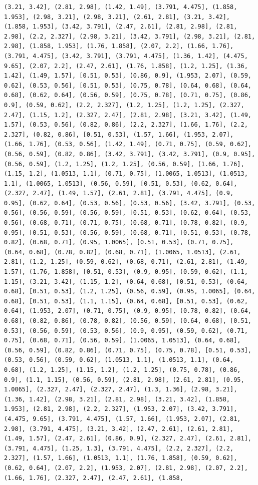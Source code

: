 \documentclass[12pt,fleqn]{article}\usepackage{../common}
\begin{document}
\begin{verbatim}
(3.21, 3.42], (2.81, 2.98], (1.42, 1.49], (3.791, 4.475], (1.858, 1.953], (2.98, 3.21], (2.98, 3.21], (2.61, 2.81], (3.21, 3.42], (1.858, 1.953], (3.42, 3.791], (2.47, 2.61], (2.81, 2.98], (2.81, 2.98], (2.2, 2.327], (2.98, 3.21], (3.42, 3.791], (2.98, 3.21], (2.81, 2.98], (1.858, 1.953], (1.76, 1.858], (2.07, 2.2], (1.66, 1.76], (3.791, 4.475], (3.42, 3.791], (3.791, 4.475], (1.36, 1.42], (4.475, 9.65], (2.07, 2.2], (2.47, 2.61], (1.76, 1.858], (1.2, 1.25], (1.36, 1.42], (1.49, 1.57], [0.51, 0.53], (0.86, 0.9], (1.953, 2.07], (0.59, 0.62], (0.53, 0.56], [0.51, 0.53], (0.75, 0.78], (0.64, 0.68], (0.64, 0.68], (0.62, 0.64], (0.56, 0.59], (0.75, 0.78], (0.71, 0.75], (0.86, 0.9], (0.59, 0.62], (2.2, 2.327], (1.2, 1.25], (1.2, 1.25], (2.327, 2.47], (1.15, 1.2], (2.327, 2.47], (2.81, 2.98], (3.21, 3.42], (1.49, 1.57], (0.53, 0.56], (0.82, 0.86], (2.2, 2.327], (1.66, 1.76], (2.2, 2.327], (0.82, 0.86], [0.51, 0.53], (1.57, 1.66], (1.953, 2.07], (1.66, 1.76], (0.53, 0.56], (1.42, 1.49], (0.71, 0.75], (0.59, 0.62], (0.56, 0.59], (0.82, 0.86], (3.42, 3.791], (3.42, 3.791], (0.9, 0.95], (0.56, 0.59], (1.2, 1.25], (1.2, 1.25], (0.56, 0.59], (1.66, 1.76], (1.15, 1.2], (1.0513, 1.1], (0.71, 0.75], (1.0065, 1.0513], (1.0513, 1.1], (1.0065, 1.0513], (0.56, 0.59], [0.51, 0.53], (0.62, 0.64], (2.327, 2.47], (1.49, 1.57], (2.61, 2.81], (3.791, 4.475], (0.9, 0.95], (0.62, 0.64], (0.53, 0.56], (0.53, 0.56], (3.42, 3.791], (0.53, 0.56], (0.56, 0.59], (0.56, 0.59], [0.51, 0.53], (0.62, 0.64], (0.53, 0.56], (0.68, 0.71], (0.71, 0.75], (0.68, 0.71], (0.78, 0.82], (0.9, 0.95], [0.51, 0.53], (0.56, 0.59], (0.68, 0.71], [0.51, 0.53], (0.78, 0.82], (0.68, 0.71], (0.95, 1.0065], [0.51, 0.53], (0.71, 0.75], (0.64, 0.68], (0.78, 0.82], (0.68, 0.71], (1.0065, 1.0513], (2.61, 2.81], (1.2, 1.25], (0.59, 0.62], (0.68, 0.71], (2.61, 2.81], (1.49, 1.57], (1.76, 1.858], [0.51, 0.53], (0.9, 0.95], (0.59, 0.62], (1.1, 1.15], (3.21, 3.42], (1.15, 1.2], (0.64, 0.68], [0.51, 0.53], (0.64, 0.68], [0.51, 0.53], (1.2, 1.25], (0.56, 0.59], (0.95, 1.0065], (0.64, 0.68], [0.51, 0.53], (1.1, 1.15], (0.64, 0.68], [0.51, 0.53], (0.62, 0.64], (1.953, 2.07], (0.71, 0.75], (0.9, 0.95], (0.78, 0.82], (0.64, 0.68], (0.82, 0.86], (0.78, 0.82], (0.56, 0.59], (0.64, 0.68], [0.51, 0.53], (0.56, 0.59], (0.53, 0.56], (0.9, 0.95], (0.59, 0.62], (0.71, 0.75], (0.68, 0.71], (0.56, 0.59], (1.0065, 1.0513], (0.64, 0.68], (0.56, 0.59], (0.82, 0.86], (0.71, 0.75], (0.75, 0.78], [0.51, 0.53], (0.53, 0.56], (0.59, 0.62], (1.0513, 1.1], (1.0513, 1.1], (0.64, 0.68], (1.2, 1.25], (1.15, 1.2], (1.2, 1.25], (0.75, 0.78], (0.86, 0.9], (1.1, 1.15], (0.56, 0.59], (2.81, 2.98], (2.61, 2.81], (0.95, 1.0065], (2.327, 2.47], (2.327, 2.47], (1.3, 1.36], (2.98, 3.21], (1.36, 1.42], (2.98, 3.21], (2.81, 2.98], (3.21, 3.42], (1.858, 1.953], (2.81, 2.98], (2.2, 2.327], (1.953, 2.07], (3.42, 3.791], (4.475, 9.65], (3.791, 4.475], (1.57, 1.66], (1.953, 2.07], (2.81, 2.98], (3.791, 4.475], (3.21, 3.42], (2.47, 2.61], (2.61, 2.81], (1.49, 1.57], (2.47, 2.61], (0.86, 0.9], (2.327, 2.47], (2.61, 2.81], (3.791, 4.475], (1.25, 1.3], (3.791, 4.475], (2.2, 2.327], (2.2, 2.327], (1.57, 1.66], (1.0513, 1.1], (1.76, 1.858], (0.59, 0.62], (0.62, 0.64], (2.07, 2.2], (1.953, 2.07], (2.81, 2.98], (2.07, 2.2], (1.66, 1.76], (2.327, 2.47], (2.47, 2.61], (1.858, 
\end{verbatim}
\end{document}
